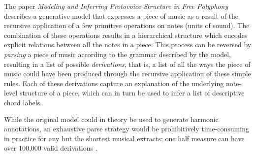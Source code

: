 \documentclass[12pt,a4paper,twoside,openright]{report}
\theoremstyle{definition}
\begin{document}
The paper \textit{Modeling and Inferring Protovoice Structure in Free Polyphony} describes a generative model that expresses a piece of music as a result of the recursive application of a few primitive operations on notes (units of sound). 
The combination of these operations results in a hierarchical structure which encodes explicit relations between all the notes in a piece. 
This process can be reversed by \textit{parsing} a piece of music according to the grammar described by the model, resulting in a list of possible \textit{derivations}, that is, a list of all the ways the piece of music could have been produced through the recursive application of these simple rules. 
Each of these derivations capture an explanation of the underlying note-level structure of a piece, which can in turn be used to infer a list of descriptive chord labels.




While the original model could in theory be used to generate harmonic annotations, an exhaustive parse strategy would be prohibitively time-consuming in practice for any but the shortest musical extracts; one half measure can have over 100,000 valid derivations \cite{finkensiepStructureFreePolyphony2023}. 

\end{document}
